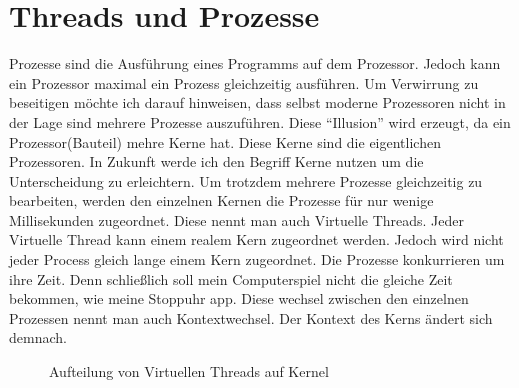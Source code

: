 \section{Threads und Prozesse}
Prozesse sind die Ausführung eines Programms auf dem Prozessor. Jedoch kann ein Prozessor maximal ein Prozess gleichzeitig ausführen. Um Verwirrung zu beseitigen möchte ich darauf hinweisen, dass selbst moderne Prozessoren nicht in der Lage sind mehrere Prozesse auszuführen. Diese ``Illusion'' wird erzeugt, da ein Prozessor(Bauteil) mehre Kerne hat. Diese Kerne sind die eigentlichen Prozessoren. In Zukunft werde ich den Begriff Kerne nutzen um die Unterscheidung zu erleichtern. Um trotzdem mehrere Prozesse gleichzeitig zu bearbeiten, werden den einzelnen Kernen die Prozesse für nur wenige Millisekunden zugeordnet. Diese nennt man auch Virtuelle Threads. Jeder Virtuelle Thread kann einem realem Kern zugeordnet werden. Jedoch wird nicht jeder Process gleich lange einem Kern zugeordnet. Die Prozesse konkurrieren um ihre Zeit. Denn schließlich soll mein Computerspiel nicht die gleiche Zeit bekommen, wie meine Stoppuhr app. Diese wechsel zwischen den einzelnen Prozessen nennt man auch Kontextwechsel. Der Kontext des Kerns ändert sich demnach.

\begin{figure}[h]
    \centering
    \caption{Aufteilung von Virtuellen Threads auf Kernel}
\end{figure}


